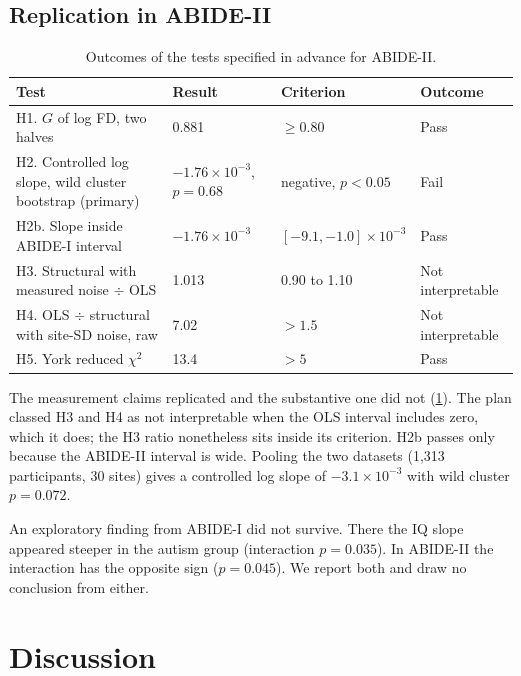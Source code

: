 \documentclass[11pt,a4paper]{article}
\begin{document}
\subsection{Replication in ABIDE-II}

\begin{table}[H]
\centering
\caption{Outcomes of the tests specified in advance for ABIDE-II.}
\label{tab:plan}
\small
\begin{tabular}{p{5.0cm}p{3.6cm}p{2.9cm}p{2.3cm}}
\toprule
Test & Result & Criterion & Outcome \\
\midrule
H1. $G$ of log FD, two halves & 0.881 & $\geq 0.80$ & Pass \\
H2. Controlled log slope, wild cluster bootstrap (primary) & $-1.76 \times 10^{-3}$, $p = 0.68$ & negative, $p < 0.05$ & Fail \\
H2b. Slope inside ABIDE-I interval & $-1.76 \times 10^{-3}$ & $[-9.1, -1.0] \times 10^{-3}$ & Pass \\
H3. Structural with measured noise $\div$ OLS & 1.013 & 0.90 to 1.10 & Not interpretable \\
H4. OLS $\div$ structural with site-SD noise, raw & 7.02 & $> 1.5$ & Not interpretable \\
H5. York reduced $\chi^2$ & 13.4 & $> 5$ & Pass \\
\bottomrule
\end{tabular}
\end{table}

The measurement claims replicated and the substantive one did not (\cref{tab:plan}). The plan classed H3 and H4 as not interpretable when the OLS interval includes zero, which it does; the H3 ratio nonetheless sits inside its criterion. H2b passes only because the ABIDE-II interval is wide. Pooling the two datasets (1,313 participants, 30 sites) gives a controlled log slope of $-3.1 \times 10^{-3}$ with wild cluster $p = 0.072$.

An exploratory finding from ABIDE-I did not survive. There the IQ slope appeared steeper in the autism group (interaction $p = 0.035$). In ABIDE-II the interaction has the opposite sign ($p = 0.045$). We report both and draw no conclusion from either.

\section{Discussion}
\end{document}
